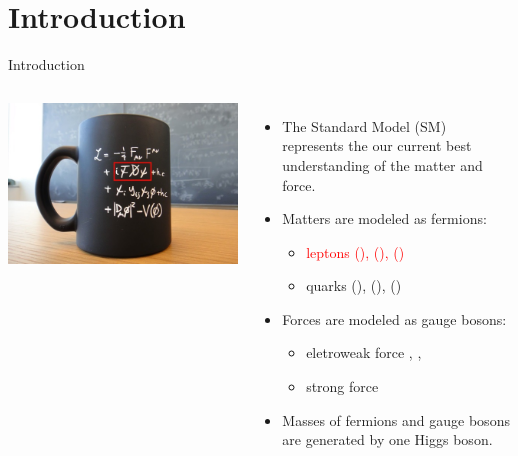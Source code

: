 \section{Introduction}

\begin{frame}{Introduction}
\smaller
    
    \begin{columns}
        \includegraphics[width=\textwidth]{slides/figures/cernmug.jpeg}
        \begin{itemize}
            \item The Standard Model (SM) represents the our current best understanding of the matter and force.
            \item Matters are modeled as fermions: 
            \begin{itemize}
            \smaller
                \item \textcolor{red}{leptons (\Pe\PGne), (\PGm\PGnGm), (\PGt\PGnGt)}
                \item quarks (\PQu\PQd), (\PQc\PQs), (\PQt\PQb)
            \end{itemize}
            \item Forces are modeled as gauge bosons:
            \begin{itemize}
            \smaller
                \item eletroweak force \PGg, \PZ, \textcolor{red}{\PW}
                \item strong force \Pg
            \end{itemize}
            \item Masses of fermions and gauge bosons are generated by one Higgs boson.
        \end{itemize}
    \end{columns}
    

\end{frame}

